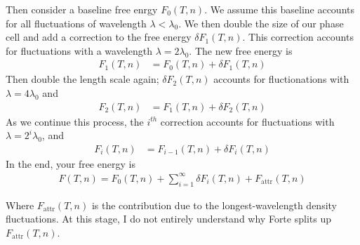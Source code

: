 \documentclass[letterpaper,twocolumn,amsmath,amssymb,prb]{revtex4-1}
\newcommand{\Fattr}{\ensuremath{F_\text{attr}(T,n)}}
\newcommand{\1}{\ensuremath{\textbf{r}_1}}
\newcommand{\2}{\ensuremath{\textbf{r}_2}}
\newcommand{\3}{\ensuremath{\textbf{r}_3}}
\newcommand{\4}{\ensuremath{\textbf{r}_4}}
\begin{document}
Then consider a baseline free enrgy $F_0(T,n)$. We assume this
baseline accounts for all fluctuations of wavelength $\lambda <
\lambda_0$. We then double the size of our phase cell and add a
correction to the free energy $\delta F_1(T,n)$. This correction
accounts for fluctuations with a wavelength $\lambda =
2\lambda_0$. The new free energy is
\begin{align}
  F_1(T,n) &= F_0(T,n) + \delta F_1(T,n)
\end{align}
Then double the length scale again; $\delta F_2(T,n)$ accounts for
fluctionations with $\lambda = 4\lambda_0$ and
\begin{align}
  F_2(T,n) &= F_1(T,n) + \delta F_2(T,n)
\end{align}
As we continue this process, the $i^{th}$ correction accounts for
fluctuations with $\lambda = 2^i\lambda_0$, and
\begin{align}
  F_i(T,n) &= F_{i-1}(T,n) + \delta F_i(T,n)
\end{align}
In the end, your free energy is
\begin{align}
  F(T,n) = F_0(T,n) + \sum_{i=1}^\infty\delta F_i(T,n) + \Fattr
\end{align}

Where $\Fattr$ is the contribution due to the longest-wavelength
density fluctuations. At this stage, I do not entirely understand why
Forte splits up $\Fattr$.
\end{document}
